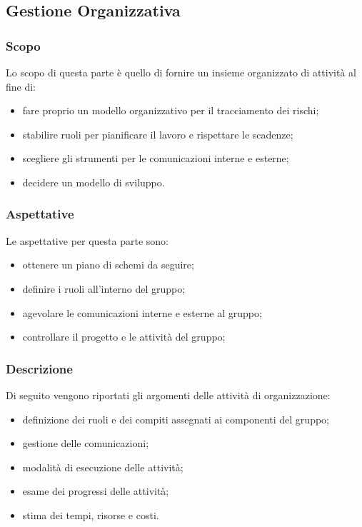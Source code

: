 \subsection{Gestione Organizzativa}
\subsubsection{Scopo}
Lo scopo di questa parte è quello di fornire un insieme organizzato di attività al fine di:
\begin{itemize}
    \item fare proprio un modello organizzativo per il tracciamento dei rischi;
    \item stabilire ruoli per pianificare il lavoro e rispettare le scadenze;
    \item scegliere gli strumenti per le comunicazioni interne e esterne;
    \item decidere un modello di sviluppo.
\end{itemize}

\subsubsection{Aspettative}
Le aspettative per questa parte sono:
\begin{itemize}
    \item ottenere un piano di schemi da seguire;
    \item definire i ruoli all'interno del gruppo;
    \item agevolare le comunicazioni interne e esterne al gruppo;
    \item controllare il progetto e le attività del gruppo;
\end{itemize}

\subsubsection{Descrizione}
Di seguito vengono riportati gli argomenti delle attività di organizzazione:
\begin{itemize}
    \item definizione dei ruoli e dei compiti assegnati ai componenti del gruppo;
    \item gestione delle comunicazioni;
    \item modalità di esecuzione delle attività;
    \item esame dei progressi delle attività;
    \item stima dei tempi, risorse e costi.
\end{itemize}

